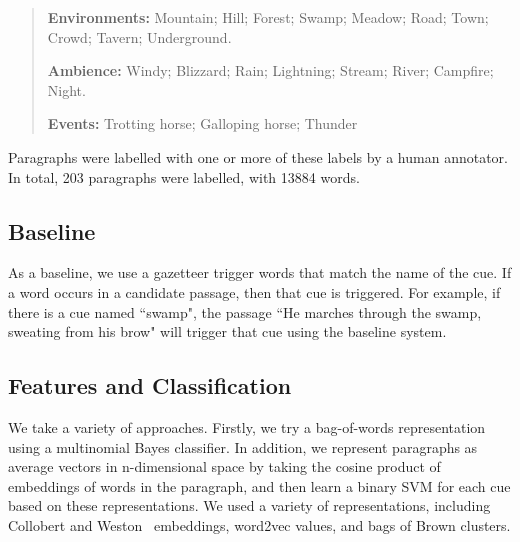 \documentclass[11pt]{article}
\begin{document}
\begin{quote}
{\bf Environments:} Mountain; Hill; Forest; Swamp; Meadow; Road; Town; Crowd; Tavern; Underground.

{\bf Ambience:} Windy; Blizzard; Rain; Lightning; Stream; River; Campfire; Night.

{\bf Events:} Trotting horse; Galloping horse; Thunder
\end{quote}

Paragraphs were labelled with one or more of these labels by a human annotator.
In total, 203 paragraphs were labelled, with 13884 words.

\iffalse
\subsection{Spoken dataset}
An eventual use of this system is to provide automatic sound effects in real-time for a story that is read out loud by a human narrator.
As a result, it should operate well on the output of a speech recognition system.
Paragraphs were read by an English native speaker, and recorded.
A speech recognition system~\cite{lamere2003design} then interpreted these readings and generated a textual version of each paragraph.
The labels used in the text input corpus were then associated with these outputs.
This constitutes the transcribed dataset.
\fi

\subsection{Baseline}
As a baseline, we use a gazetteer trigger words that match the name of the cue.
If a word occurs in a candidate passage, then that cue is triggered.
For example, if there is a cue named ``swamp", the passage ``He marches through the swamp, sweating from his brow" will trigger that cue using the baseline system.

\subsection{Features and Classification}

We take a variety of approaches.
Firstly, we try a bag-of-words representation using a multinomial Bayes classifier.
In addition, we represent paragraphs as average vectors in n-dimensional space by taking the cosine product of embeddings of words in the paragraph, and then learn a binary SVM for each cue based on these representations.
We used a variety of representations, including Collobert and Weston~\cite{collobert2008unified} embeddings, word2vec values, and bags of Brown clusters.
\end{document}

